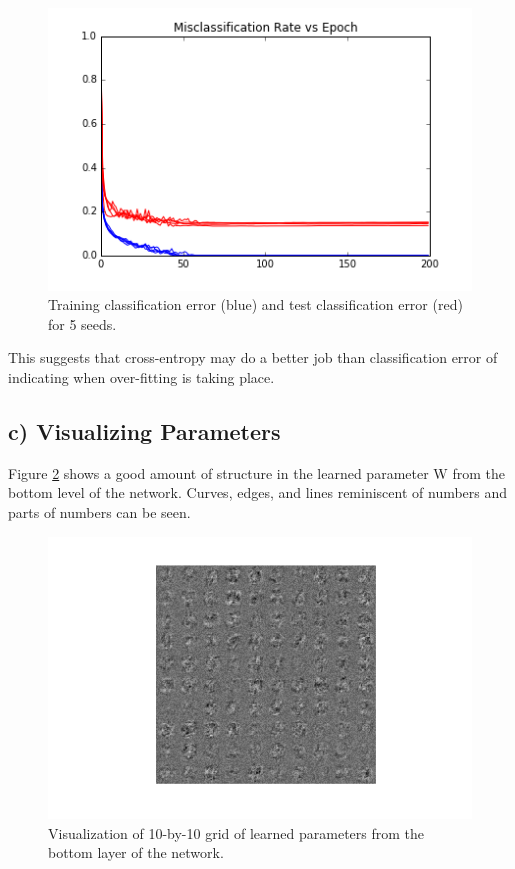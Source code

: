 \documentclass{article}
\begin{document}
\begin{figure}[h]
  \centering 
  \includegraphics[scale=0.6]{../5b_misclassification_vs_epoch_200.png} 
  \caption{Training classification error (blue) and test classification error (red) for 5 seeds.}
  \label{fig:class1}
\end{figure}

This suggests that cross-entropy may do a better job than classification error of indicating when over-fitting is taking place. 


\subsection{c) Visualizing Parameters}

Figure \ref{fig:paramviz} shows a good amount of structure in the learned parameter W from the bottom level of the network. Curves, edges, and lines reminiscent of numbers and parts of numbers can be seen. 

\begin{figure}[h]
  \centering
  \includegraphics[scale=0.9]{../5c_parameter_viz.png} 
  \caption{Visualization of 10-by-10 grid of learned parameters from the bottom layer of the network.}
  \label{fig:paramviz}
\end{figure}
\end{document}
